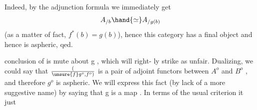  Indeed, by the adjunction formula we immediately get
\[ A_{/b} \hand{\simeq} A_{/g(b)} \]
(as a matter of fact, $f^{*}(b) = g(b)$), hence this category has a final
object and hence is aspheric, qed.

  conclusion of  is mute about g , which will right-%
ly strike as unfair. Dualizing, we could say that $(\over{\unsure{f}}{g}^{o} ,f^{o})$ is a pair
of adjoint functors between $A^{o}$ and $B^{o}$ , and therefore $g^{o}$ is aspheric.
We will express this fact (by lack of a more suggestive name) by saying
that g is a \hand{\uline{\textcolor{black}{coaspheric}}} map .  In terms of the usual criterion\hand{,} it just

